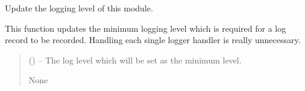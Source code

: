 \documentclass[letterpaper,11pt,english]{sphinxmanual}
\begin{document}

\begin{savenotes}\begin{fulllineitems}
\label{\detokenize{code/lezargus.library.logging:lezargus.library.logging.update_global_minimum_logging_level}}
\pysigstartsignatures
{}
\pysigstopsignatures
\sphinxAtStartPar
Update the logging level of this module.

\sphinxAtStartPar
This function updates the minimum logging level which is required for
a log record to be recorded. Handling each single logger handler is really
unnecessary.
\begin{quote}\begin{description}
\sphinxAtStartPar
{} (\sphinxstyleliteralemphasis{\sphinxupquote{, }}) – The log level which will be set as the minimum level.

\sphinxAtStartPar
None

\end{description}\end{quote}

\end{fulllineitems}\end{savenotes}

\end{document}
